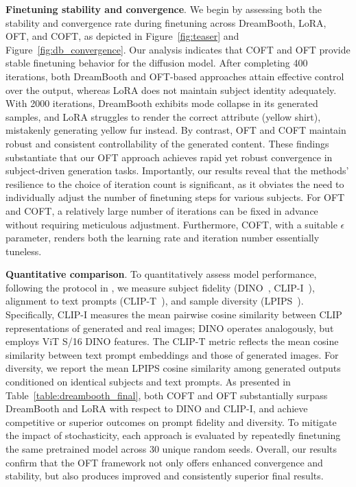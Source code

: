 \textbf{Finetuning stability and convergence}. We begin by assessing both the stability and convergence rate during finetuning across DreamBooth, LoRA, OFT, and COFT, as depicted in Figure~\ref{fig:teaser} and Figure~\ref{fig:db_convergence}. Our analysis indicates that COFT and OFT provide stable finetuning behavior for the diffusion model. After completing 400 iterations, both DreamBooth and OFT-based approaches attain effective control over the output, whereas LoRA does not maintain subject identity adequately. With 2000 iterations, DreamBooth exhibits mode collapse in its generated samples, and LoRA struggles to render the correct attribute (yellow shirt), mistakenly generating yellow fur instead. By contrast, OFT and COFT maintain robust and consistent controllability of the generated content. These findings substantiate that our OFT approach achieves rapid yet robust convergence in subject-driven generation tasks. Importantly, our results reveal that the methods' resilience to the choice of iteration count is significant, as it obviates the need to individually adjust the number of finetuning steps for various subjects. For OFT and COFT, a relatively large number of iterations can be fixed in advance without requiring meticulous adjustment. Furthermore, COFT, with a suitable $\epsilon$ parameter, renders both the learning rate and iteration number essentially tuneless.

\textbf{Quantitative comparison}. To quantitatively assess model performance, following the protocol in \cite{ruiz2023dreambooth}, we measure subject fidelity (DINO~\cite{caron2021emerging}, CLIP-I~\cite{radford2021learning}), alignment to text prompts (CLIP-T~\cite{radford2021learning}), and sample diversity (LPIPS~\cite{zhang2018unreasonable}). Specifically, CLIP-I measures the mean pairwise cosine similarity between CLIP representations of generated and real images; DINO operates analogously, but employs ViT S/16 DINO features. The CLIP-T metric reflects the mean cosine similarity between text prompt embeddings and those of generated images. For diversity, we report the mean LPIPS cosine similarity among generated outputs conditioned on identical subjects and text prompts. As presented in Table~\ref{table:dreambooth_final}, both COFT and OFT substantially surpass DreamBooth and LoRA with respect to DINO and CLIP-I, and achieve competitive or superior outcomes on prompt fidelity and diversity. To mitigate the impact of stochasticity, each approach is evaluated by repeatedly finetuning the same pretrained model across 30 unique random seeds. Overall, our results confirm that the OFT framework not only offers enhanced convergence and stability, but also produces improved and consistently superior final results.

